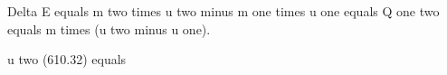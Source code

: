 Delta E equals m two times u two minus m one times u one equals Q one two equals m times (u two minus u one).  

u two (610.32) equals
